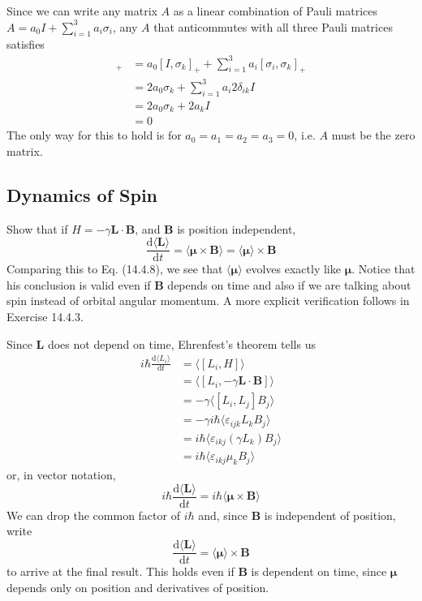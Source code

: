 \documentclass[../principles-of-quantum-mechanics.tex]{subfiles}
\begin{document}
\begin{questions}
\begin{solution}
			Since we can write any matrix $A$ as a linear combination of Pauli matrices $A = a_0I + \sum_{i=1}^{3}a_i\sigma_i$, any $A$ that anticommutes with all three Pauli matrices satisfies
			\begin{align*}
				[A, \sigma_k]_+ &= a_0[I, \sigma_k]_+ + \sum_{i=1}^3a_i[\sigma_i, \sigma_k]_+ \\
				&= 2a_0\sigma_k + \sum_{i=1}^3a_i2\delta_{ik}I \\
				&= 2a_0\sigma_k + 2a_kI \\
				&= 0
			\end{align*}
			The only way for this to hold is for $a_0 = a_1 = a_2 = a_3 = 0$, i.e. $A$ must be the zero matrix.
		\end{solution}
	
		\setcounter{subsection}{3}
		\setcounter{question}{0}
		\subsection{Dynamics of Spin}
		
		\question Show that if $H = -\gamma\mathbf{L}\cdot\mathbf{B}$, and $\mathbf{B}$ is position independent,
		$$\frac{\mathrm{d}\langle\mathbf{L}\rangle}{\mathrm{d}t} = \langle\boldsymbol{\mu}\times\mathbf{B}\rangle = \langle\boldsymbol{\mu}\rangle\times\mathbf{B}$$
		Comparing this to Eq. (14.4.8), we see that $\langle\boldsymbol{\mu}\rangle$ evolves exactly like $\boldsymbol{\mu}$. Notice that his conclusion is valid even if $\mathbf{B}$ depends on time and also if we are talking about spin instead of orbital angular momentum. A more explicit verification follows in Exercise 14.4.3.
		\begin{solution}
			Since $\mathbf{L}$ does not depend on time, Ehrenfest's theorem tells us
			\begin{align*}
				i\hbar\frac{\mathrm{d}\langle L_i\rangle}{\mathrm{d}t} &= \langle[L_i, H]\rangle \\
				&= \langle [L_i, -\gamma\mathbf{L}\cdot\mathbf{B}]\rangle \\
				&= -\gamma\langle [L_i, L_j]B_j\rangle \\
				&= -\gamma i\hbar\langle \varepsilon_{ijk}L_kB_j\rangle \\
				&=  i\hbar\langle \varepsilon_{ikj}(\gamma L_k)B_j\rangle \\
				&=  i\hbar\langle \varepsilon_{ikj}\mu_kB_j\rangle
			\end{align*}
			or, in vector notation,
			$$i\hbar\frac{\mathrm{d}\langle\mathbf{L}\rangle}{\mathrm{d}t} = i\hbar\langle\boldsymbol{\mu}\times\mathbf{B}\rangle$$
			We can drop the common factor of $i\hbar$ and, since $\mathbf{B}$ is independent of position, write
			$$\frac{\mathrm{d}\langle\mathbf{L}\rangle}{\mathrm{d}t} = \langle\boldsymbol{\mu}\rangle\times\mathbf{B}$$
			to arrive at the final result. This holds even if $\mathbf{B}$ is dependent on time, since $\boldsymbol{\mu}$ depends only on position and derivatives of position.
		\end{solution}
		

\end{questions}
\end{document}

